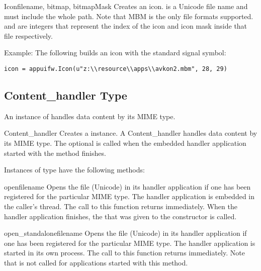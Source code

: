 \begin{classdesc}{Icon}{filename, bitmap, bitmapMask}
Creates an icon.  is a Unicode file name and must 
include the whole path. Note that MBM is the only file formats supported.
 and  are integers that represent the index of 
the icon and icon mask inside that file respectively.
\end{classdesc}

Example: The following builds an icon with the standard signal symbol:
\begin{verbatim}
icon = appuifw.Icon(u"z:\\resource\\apps\\avkon2.mbm", 28, 29)
\end{verbatim}

\subsection{Content\_handler Type}
\label{subsec:content}

An instance of  handles data content by its MIME 
type.

\begin{classdesc}{Content_handler}{}
Creates a  instance. A Content_handler handles
data content by its MIME type. The optional
 is called when the embedded handler application 
started with the  method finishes. 
\end{classdesc}

Instances of  type have the following methods:

\begin{methoddesc}{open}{filename}
Opens the file  (Unicode) in its handler 
application if one has been registered for the particular MIME type. The 
handler application is embedded in the caller's thread. The call to this 
function returns immediately. When the handler application finishes, the 
 that was given to the  
constructor is called.
\end{methoddesc}

\begin{methoddesc}{open_standalone}{filename}
Opens the file  (Unicode) in its handler 
application if one has been registered for the particular MIME type. The 
handler application is started in its own process. The call to this function 
returns immediately. Note that  is not called for 
applications started with this method.
\end{methoddesc}


